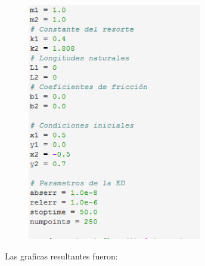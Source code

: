 \documentclass[12pt]{article}
\begin{document}
\begin{figure}[h!]
    \centering
\includegraphics[width=3in]{Cod6.png}
\end{figure}

Las graficas resultantes fueron: \\ \\
\end{document}

